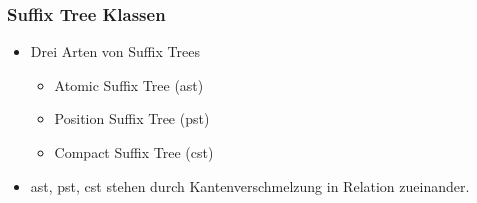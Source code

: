 \documentclass{beamer}
\begin{document}
\begin{frame}
\frametitle{Suffix Tree Klassen}
\begin{itemize}
    \item Drei Arten von Suffix Trees
    \begin{itemize}
        \item Atomic Suffix Tree (ast)
        \item Position Suffix Tree (pst)
        \item Compact Suffix Tree (cst)
    \end{itemize}
    \item ast, pst, cst stehen durch Kantenverschmelzung in Relation zueinander.
\end{itemize}
\end{frame}
\end{document}
